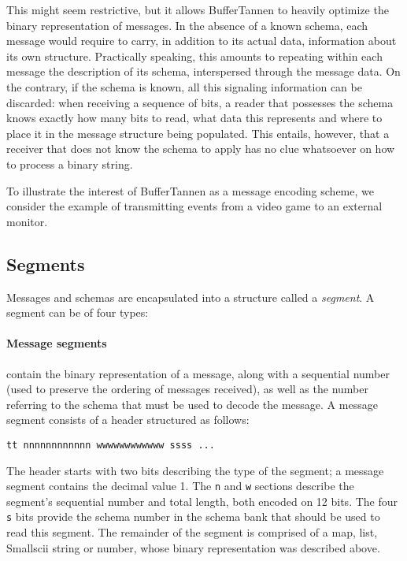 This might seem restrictive, but it allows BufferTannen to heavily optimize the binary representation of messages. In the absence of a known schema, each message would require to carry, in addition to its actual data, information about its own structure. %
%
Practically speaking, this amounts to repeating within each message the description of its schema, interspersed through the message data. On the contrary, if the schema is known, all this signaling information can be discarded: when receiving a sequence of bits, a reader that possesses the schema knows exactly how many bits to read, what data this represents and where to place it in the message structure being populated. This entails, however, that a receiver that does not know the schema to apply has no clue whatsoever on how to process a binary string.

To illustrate the interest of BufferTannen as a message encoding scheme, we consider the example of transmitting events from a video game to an external monitor.

\subsection{Segments}
\setcounter{paragraph}{0}

Messages and schemas are encapsulated into a structure called a \emph{segment}. A segment can be of four types:

\paragraph{Message segments} contain the binary representation of a message, along with a sequential number (used to preserve the ordering of messages received), as well as the number referring to the schema that must be used to decode the message. A message segment consists of a header structured as follows:

\begin{verbatim}
tt nnnnnnnnnnnn wwwwwwwwwwww ssss ...
\end{verbatim}

The header starts with two bits describing the type of the segment; a message segment contains the decimal value 1. The \verb+n+ and \verb+w+ sections describe the segment's sequential number and total length, both encoded on 12 bits. The four \verb+s+ bits provide the schema number in the schema bank that should be used to read this segment. The remainder of the segment is comprised of a map, list, Smallscii string or number, whose binary representation was described above.

